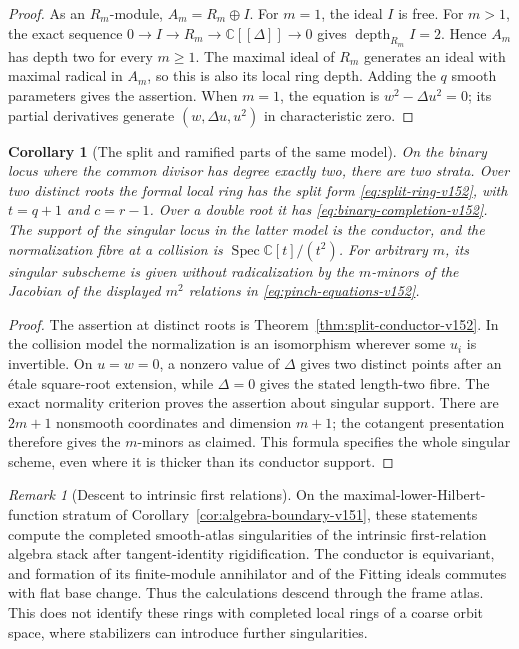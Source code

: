 \documentclass[11pt,reqno]{amsart}
\numberwithin{equation}{section}
\newtheorem{corollary}[theorem]{Corollary}
\theoremstyle{definition}\newtheorem{definition}[theorem]{Definition}
\theoremstyle{remark}\newtheorem{remark}[theorem]{Remark}
\newcommand{\C}{\mathbb C}\newcommand{\Q}{\mathbb Q}
\DeclareMathOperator{\Spec}{Spec}\DeclareMathOperator{\PGL}{PGL}
\begin{document}
\begin{proof}
As an $R_m$-module, $A_m=R_m\oplus I$.  For $m=1$, the ideal
$I$ is free.  For $m>1$, the exact sequence
$0\to I\to R_m\to\C[[\Delta]]\to0$ gives
$\operatorname{depth}_{R_m}I=2$.  Hence $A_m$ has depth two
for every $m\geq1$.  The maximal ideal of $R_m$ generates an
ideal with maximal radical in $A_m$, so this is also its local
ring depth.  Adding the $q$ smooth parameters gives the assertion.
When $m=1$, the equation is $w^2-\Delta u^2=0$; its partial
derivatives generate $(w,\Delta u,u^2)$ in characteristic zero.
\end{proof}

\begin{corollary}[The split and ramified parts of the same model]
\label{cor:collision-strata-v152}
On the binary locus where the common divisor has degree exactly two,
there are two strata.  Over two distinct roots the formal local ring
has the split form \eqref{eq:split-ring-v152}, with
$t=q+1$ and $c=r-1$.  Over a double root it has
\eqref{eq:binary-completion-v152}.  The support of the singular
locus in the latter model is the conductor, and the normalization
fibre at a collision is $\Spec\C[t]/(t^2)$.
For arbitrary $m$, its singular subscheme is given without
radicalization by the $m$-minors of the Jacobian of the displayed
$m^2$ relations in \eqref{eq:pinch-equations-v152}.
\end{corollary}
\begin{proof}
The assertion at distinct roots is Theorem~\ref{thm:split-conductor-v152}.
In the collision model the normalization is an isomorphism wherever
some $u_i$ is invertible.  On $u=w=0$, a nonzero value of $\Delta$
gives two distinct points after an \'etale square-root extension,
while $\Delta=0$ gives the stated length-two fibre.  The exact
normality criterion proves the assertion about singular support.
There are $2m+1$ nonsmooth coordinates and dimension $m+1$;
the cotangent presentation therefore gives the $m$-minors as
claimed.  This formula specifies the whole singular scheme, even
where it is thicker than its conductor support.
\end{proof}

\begin{remark}[Descent to intrinsic first relations]
\label{rem:conductor-stack-v152}
On the maximal-lower-Hilbert-function stratum of
Corollary~\ref{cor:algebra-boundary-v151}, these statements compute
the completed smooth-atlas singularities of the intrinsic
first-relation algebra stack after tangent-identity rigidification.
The conductor is equivariant, and formation of its finite-module
annihilator and of the Fitting ideals commutes with flat base change.
Thus the calculations descend through the frame atlas.  This does
not identify these rings with completed local rings of a coarse
orbit space, where stabilizers can introduce further singularities.
\end{remark}
\end{document}
